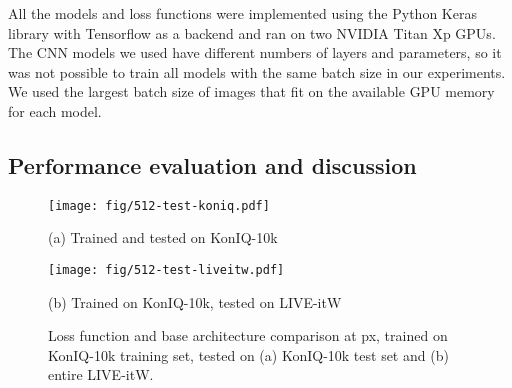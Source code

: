 \documentclass[10pt,journal,compsoc]{IEEEtran}
\begin{document}
All the models and loss functions were implemented using the Python Keras library with Tensorflow as a backend \cite{keras} and ran on two NVIDIA Titan Xp GPUs. The CNN models we used have different numbers of layers and parameters, so it was not possible to train all models with the same batch size in our experiments. We used the largest batch size of  images that fit on the available GPU memory for each model.





















































\subsection{Performance evaluation and discussion}



\begin{figure*}[!ht]
\centering
\begin{minipage}{0.4\linewidth}
\centerline{\texttt{[image: fig/512-test-koniq.pdf]}}
\centerline{(a) Trained and tested on KonIQ-10k}
\end{minipage}
\begin{minipage}{0.4\linewidth}
\centerline{\texttt{[image: fig/512-test-liveitw.pdf]}}
\centerline{(b) Trained on KonIQ-10k, tested on LIVE-itW}
\end{minipage}
\caption{Loss function and base architecture comparison at  px, trained on KonIQ-10k training set, tested on (a) KonIQ-10k test set and (b) entire LIVE-itW.}
\label{fig:512-test}
\vspace{-15pt}
\end{figure*}
\end{document}
